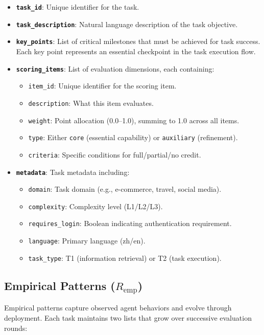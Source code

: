 \begin{itemize}[leftmargin=*]
    \item \textbf{\texttt{task\_id}}: Unique identifier for the task.
    \item \textbf{\texttt{task\_description}}: Natural language description of the task objective.
    \item \textbf{\texttt{key\_points}}: List of critical milestones that must be achieved for task success. Each key point represents an essential checkpoint in the task execution flow.
    \item \textbf{\texttt{scoring\_items}}: List of evaluation dimensions, each containing:
    \begin{itemize}
        \item \texttt{item\_id}: Unique identifier for the scoring item.
        \item \texttt{description}: What this item evaluates.
        \item \texttt{weight}: Point allocation (0.0--1.0), summing to 1.0 across all items.
        \item \texttt{type}: Either \texttt{core} (essential capability) or \texttt{auxiliary} (refinement).
        \item \texttt{criteria}: Specific conditions for full/partial/no credit.
    \end{itemize}
    \item \textbf{\texttt{metadata}}: Task metadata including:
    \begin{itemize}
        \item \texttt{domain}: Task domain (e.g., e-commerce, travel, social media).
        \item \texttt{complexity}: Complexity level (L1/L2/L3).
        \item \texttt{requires\_login}: Boolean indicating authentication requirement.
        \item \texttt{language}: Primary language (zh/en).
        \item \texttt{task\_type}: T1 (information retrieval) or T2 (task execution).
    \end{itemize}
\end{itemize}

\subsection{Empirical Patterns ($R_{\text{emp}}$)}

Empirical patterns capture observed agent behaviors and evolve through deployment. Each task maintains two lists that grow over successive evaluation rounds:

